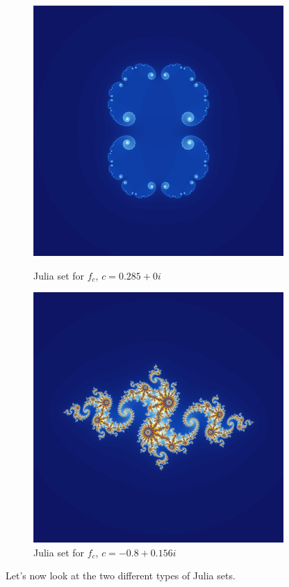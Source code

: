 \documentclass[a4paper,11pt]{article}
\theoremstyle{definition}
\numberwithin{equation}{section} %
\begin{document}
\begin{figure}[h]
    \centering
    \begin{minipage}{.5\textwidth}
        \centering
        \includegraphics[width=.5\linewidth]{figures/Julia_0.285_0.png}
        \caption[width=.2\textwidth]{Julia set for $f_c$, $c =  0.285 + 0i$ \cite{julia-sets-examples}}
        \label{fig:Julia_ex_1}
    \end{minipage}%
    \begin{minipage}{.5\textwidth}
        \centering
        \includegraphics[width=.5\linewidth]{figures/Julia_-0.8_0.156.png}
        \caption[width=.2\textwidth]{Julia set for $f_c$, $c = -0.8 + 0.156i$ \cite{julia-sets-examples}}
        \label{fig:Julia_ex_2}
    \end{minipage}
\end{figure}



Let's now look at the two different types of Julia sets.
\end{document}
